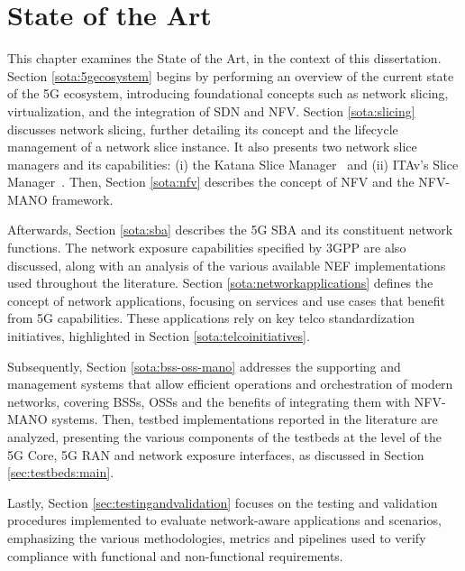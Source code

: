 \chapter{State of the Art}
\label{chap:SOTA}

This chapter examines the State of the Art, in the context of this dissertation. Section \ref{sota:5gecosystem} begins by performing an overview of the current state of the \acs{5G} ecosystem, introducing foundational concepts such as network slicing, virtualization, and the integration of \acs{SDN} and \acs{NFV}. Section \ref{sota:slicing} discusses network slicing, further detailing its concept and the lifecycle management of a network slice instance. It also presents two network slice managers and its capabilities: (i) the Katana Slice Manager~\cite{KatanaSliceManagerWiki} and (ii) \acs{ITAv}'s Slice Manager~\cite{ITAvSliceManager}. Then, Section \ref{sota:nfv} describes the concept of \acf{NFV} and the \acf{NFV-MANO} framework.

Afterwards, Section \ref{sota:sba} describes the \acs{5G} \acf{SBA} and its constituent network functions. The network exposure capabilities specified by \acs{3GPP} are also discussed, along with an analysis of the various available \acf{NEF} implementations used throughout the literature. Section \ref{sota:networkapplications} defines the concept of network applications, focusing on services and use cases that benefit from \acs{5G} capabilities. These applications rely on key telco standardization initiatives, highlighted in Section \ref{sota:telcoinitiatives}.

Subsequently, Section \ref{sota:bss-oss-mano} addresses the supporting and management systems that allow efficient operations and orchestration of modern networks, covering \acfp{BSS}, \acfp{OSS} and the benefits of integrating them with \acs{NFV-MANO} systems. Then, testbed implementations reported in the literature are analyzed, presenting the various components of the testbeds at the level of the \acs{5G} Core, \acs{5G} \acs{RAN} and network exposure interfaces, as discussed in Section \ref{sec:testbeds:main}.

Lastly, Section \ref{sec:testingandvalidation} focuses on the testing and validation procedures implemented to evaluate network-aware applications and scenarios, emphasizing the various methodologies, metrics and pipelines used to verify compliance with functional and non-functional requirements. 












